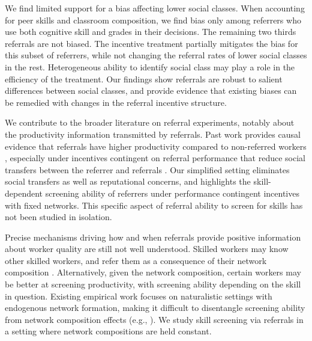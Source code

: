 \documentclass[11pt,a4paper,oneside]{article}
\begin{document}
We find limited support for a bias affecting lower social classes. When accounting for peer skills and classroom composition, we find bias only among referrers who use both cognitive skill and grades in their decisions. The remaining two thirds referrals are not biased. The incentive treatment partially mitigates the bias for this subset of referrers, while not changing the referral rates of lower social classes in the rest. Heterogeneous ability to identify social class may play a role in the efficiency of the treatment. Our findings show referrals are robust to salient differences between social classes, and provide evidence that existing biases can be remedied with changes in the referral incentive structure.   

We contribute to the broader literature on referral experiments, notably about the productivity information transmitted by referrals. Past work provides causal evidence that referrals have higher productivity compared to non-referred workers \citep{pallais_why_2016}, especially under incentives contingent on referral performance that reduce social transfers between the referrer and referrals \citep{beaman_who_2012,witte2021workers}. Our simplified setting eliminates social transfers as well as reputational concerns, and highlights the skill-dependent screening ability of referrers under performance contingent incentives with fixed networks. This specific aspect of referral ability to screen for skills has not been studied in isolation.  

Precise mechanisms driving how and when referrals provide positive information about worker quality are still not well understood. Skilled workers may know other skilled workers, and refer them as a consequence of their network composition \citep{montgomery_social_1991}. Alternatively, given the network composition, certain workers may be better at screening productivity, with screening ability depending on the skill in question. Existing empirical work focuses on naturalistic settings with endogenous network formation, making it difficult to disentangle screening ability from network composition effects (e.g., \citet{beaman_who_2012,pallais_why_2016}). We study skill screening via referrals in a setting where network compositions are held constant.   
\end{document}
